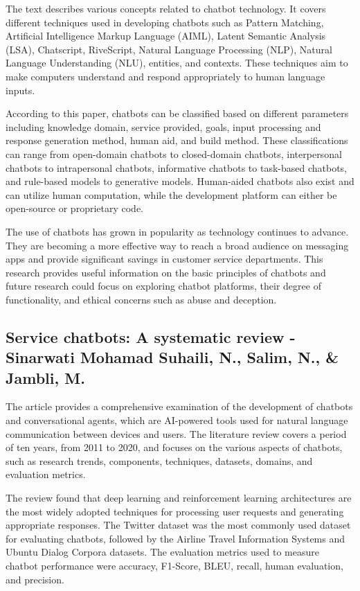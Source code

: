 \documentclass[12pt, twoside]{article}
\begin{document}
The text describes various concepts related to chatbot technology. It covers different techniques used in developing chatbots such as Pattern Matching, Artificial Intelligence Markup Language (AIML), Latent Semantic Analysis (LSA), Chatscript, RiveScript, Natural Language Processing (NLP), Natural Language Understanding (NLU), entities, and contexts. These techniques aim to make computers understand and respond appropriately to human language inputs.

According to this paper, chatbots can be classified based on different parameters including knowledge domain, service provided, goals, input processing and response generation method, human aid, and build method. These classifications can range from open-domain chatbots to closed-domain chatbots, interpersonal chatbots to intrapersonal chatbots, informative chatbots to task-based chatbots, and rule-based models to generative models. Human-aided chatbots also exist and can utilize human computation, while the development platform can either be open-source or proprietary code.

The use of chatbots has grown in popularity as technology continues to advance. They are becoming a more effective way to reach a broad audience on messaging apps and provide significant savings in customer service departments. This research provides useful information on the basic principles of chatbots and future research could focus on exploring chatbot platforms, their degree of functionality, and ethical concerns such as abuse and deception.


\subsection{Service chatbots: A systematic review - Sinarwati Mohamad Suhaili, N., Salim, N., \& Jambli, M.\cite{3}}
The article provides a comprehensive examination of the development of chatbots and conversational agents, which are AI-powered tools used for natural language communication between devices and users. The literature review covers a period of ten years, from 2011 to 2020, and focuses on the various aspects of chatbots, such as research trends, components, techniques, datasets, domains, and evaluation metrics.

The review found that deep learning and reinforcement learning architectures are the most widely adopted techniques for processing user requests and generating appropriate responses. The Twitter dataset was the most commonly used dataset for evaluating chatbots, followed by the Airline Travel Information Systems and Ubuntu Dialog Corpora datasets. The evaluation metrics used to measure chatbot performance were accuracy, F1-Score, BLEU, recall, human evaluation, and precision.
\end{document}

